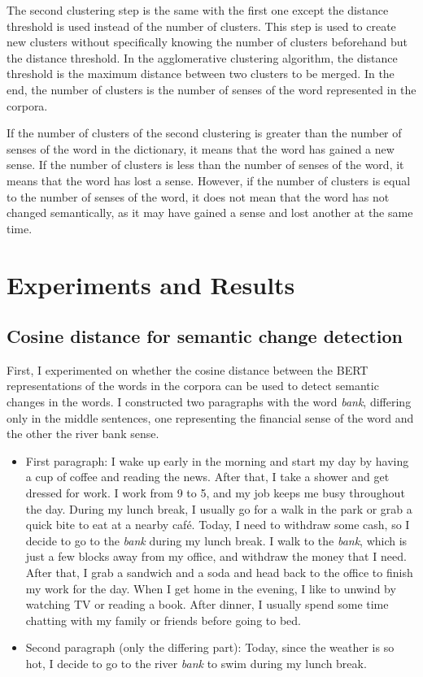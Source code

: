 \documentclass[11pt]{article}
\begin{document}
The second clustering step is the same with the first one except the distance threshold is used instead of the number of clusters.
This step is used to create new clusters without specifically knowing the number of clusters beforehand but the distance threshold.
In the agglomerative clustering algorithm, the distance threshold is the maximum distance between two clusters to be merged.
In the end, the number of clusters is the number of senses of the word represented in the corpora.

If the number of clusters of the second clustering is greater than the number of senses of the word in the dictionary, it means that the word has gained a new sense.
If the number of clusters is less than the number of senses of the word, it means that the word has lost a sense.
However, if the number of clusters is equal to the number of senses of the word, it does not mean that the word has not changed semantically, as it may have gained a sense and lost another at the same time.

\section{Experiments and Results}

\subsection{Cosine distance for semantic change detection}

First, I experimented on whether the cosine distance between the BERT representations of the words in the corpora can be used to detect semantic changes in the words.
I constructed two paragraphs with the word \textit{bank}, differing only in the middle sentences, one representing the financial sense of the word and the other the river bank sense.

\begin{itemize}
  \item First paragraph: I wake up early in the morning and start my day by having a cup of coffee and reading the news. After that, I take a shower and get dressed for work. I work from 9 to 5, and my job keeps me busy throughout the day. During my lunch break, I usually go for a walk in the park or grab a quick bite to eat at a nearby café. {\color{red} Today, I need to withdraw some cash, so I decide to go to the \textit{bank} during my lunch break. I walk to the \textit{bank}, which is just a few blocks away from my office, and withdraw the money that I need.} After that, I grab a sandwich and a soda and head back to the office to finish my work for the day. When I get home in the evening, I like to unwind by watching TV or reading a book. After dinner, I usually spend some time chatting with my family or friends before going to bed.
  \item Second paragraph (only the differing part): {\color{red} Today, since the weather is so hot, I decide to go to the river \textit{bank} to swim during my lunch break.}
\end{itemize}
\end{document}
